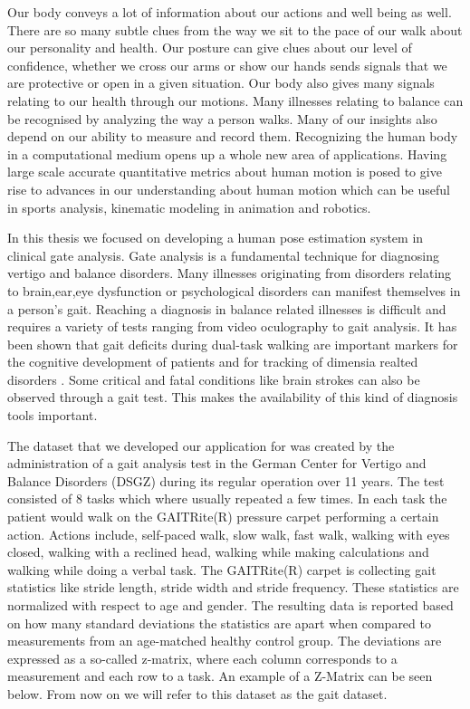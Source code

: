 Our body conveys a lot of information about our actions and well being as well. There are so many subtle clues from the way we sit to the pace of our walk about our personality and health. Our posture can give clues about our level of confidence, whether we cross our arms or show our hands sends signals that we are protective or open in a given situation. Our body also gives many signals relating to our health through our motions. Many illnesses relating to balance can be recognised by analyzing the way a person walks. Many of our insights also depend on our ability to measure and record them. Recognizing the human body in a computational medium opens up a whole new area of applications. Having large scale accurate quantitative metrics about human motion is posed to give rise to advances in our understanding about human motion which can be useful in sports analysis, kinematic modeling in animation and robotics. 

In this thesis we focused on developing a human pose estimation system in clinical gate analysis. Gate analysis is a fundamental technique for diagnosing vertigo and balance disorders. Many illnesses originating from disorders relating to brain,ear,eye dysfunction or psychological disorders can manifest themselves in a person's gait. Reaching a diagnosis in balance related illnesses is difficult and requires a variety of tests ranging from video oculography to gait analysis. It has been shown that gait deficits during dual-task walking are important markers for the cognitive development of patients and for tracking of dimensia realted disorders \parencite{schniepp2016erfassung}. Some critical and fatal conditions like brain strokes can also be observed through a gait test. This makes the availability of this kind of diagnosis tools important.

The dataset that we developed our application for was created by the administration of a gait analysis test in the German Center for Vertigo and Balance Disorders (DSGZ) during its regular operation over 11 years. The test consisted of 8 tasks which where usually repeated a few times. In each task the patient would walk on the GAITRite(R) pressure carpet performing a certain action. Actions include, self-paced walk, slow walk, fast walk, walking with eyes closed, walking with a reclined head, walking while making calculations and walking while doing a verbal task. The GAITRite(R) carpet is collecting gait statistics like stride length, stride width and stride frequency. These statistics are normalized with respect to age and gender. The resulting data is reported based on how many standard deviations the statistics are apart when compared to measurements from an age-matched healthy control group. The deviations are expressed as a so-called z-matrix, where each column corresponds to a measurement and each row to a task. An example of a Z-Matrix can be seen below. From now on we will refer to this dataset as the gait dataset.

